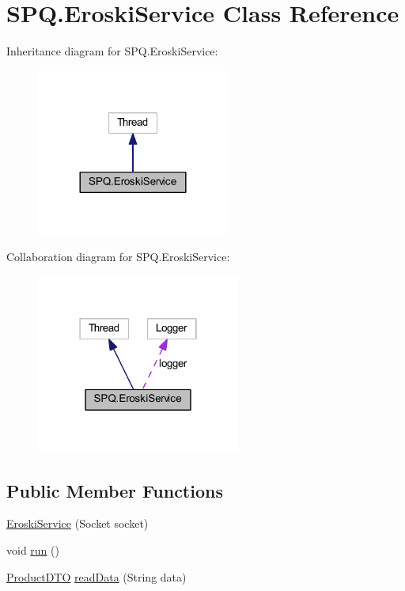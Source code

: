 \hypertarget{class_s_p_q_1_1_eroski_service}{}\section{S\+P\+Q.\+Eroski\+Service Class Reference}
\label{class_s_p_q_1_1_eroski_service}


Inheritance diagram for S\+P\+Q.\+Eroski\+Service\+:\nopagebreak
\begin{figure}[H]
\begin{center}
\leavevmode
\includegraphics[width=180pt]{class_s_p_q_1_1_eroski_service__inherit__graph}
\end{center}
\end{figure}


Collaboration diagram for S\+P\+Q.\+Eroski\+Service\+:\nopagebreak
\begin{figure}[H]
\begin{center}
\leavevmode
\includegraphics[width=190pt]{class_s_p_q_1_1_eroski_service__coll__graph}
\end{center}
\end{figure}
\subsection*{Public Member Functions}
\begin{DoxyCompactItemize}
\item 
\mbox{\hyperlink{class_s_p_q_1_1_eroski_service_a89b9137c5a6ba87692037a4b0bc2b14e}{Eroski\+Service}} (Socket socket)
\item 
void \mbox{\hyperlink{class_s_p_q_1_1_eroski_service_abacda123f2febc1eb7c2825eb4e46c37}{run}} ()
\item 
\mbox{\hyperlink{class_s_p_q_1_1dto_1_1_product_d_t_o}{Product\+D\+TO}} \mbox{\hyperlink{class_s_p_q_1_1_eroski_service_a89fa3f97cdca647e3c6d6606e5dc2443}{read\+Data}} (String data)
\end{DoxyCompactItemize}


